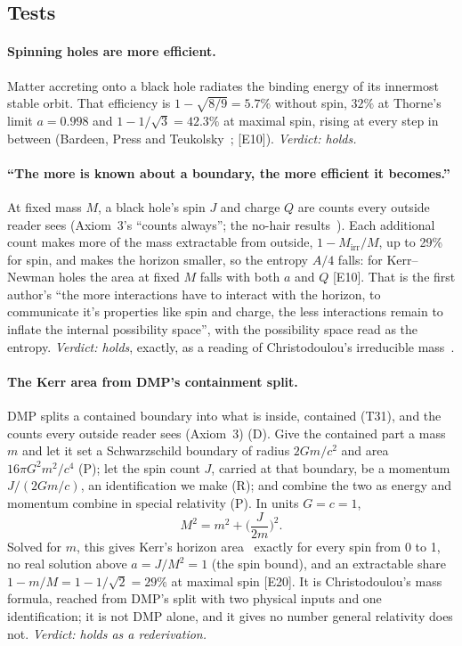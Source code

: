 \documentclass[11pt,a4paper]{article}
\theoremstyle{definition}
\theoremstyle{remark}
\newcommand{\chk}[1]{\textsf{[#1]}}
\newcommand{\tagD}{\textsf{(D)}}
\newcommand{\tagR}{\textsf{(R)}}
\newcommand{\tagP}{\textsf{(P)}}
\begin{document}
\subsection{Tests}

\paragraph{Spinning holes are more efficient.} Matter accreting onto a black hole radiates the binding energy of its innermost stable
orbit. That efficiency is $1-\sqrt{8/9}=5.7\%$ without spin, $32\%$ at Thorne's limit $a=0.998$ and $1-1/\sqrt3=42.3\%$ at maximal spin,
rising at every step in between (Bardeen, Press and Teukolsky~\cite{bpt}; \chk{E10}). \emph{Verdict: holds.}

\paragraph{``The more is known about a boundary, the more efficient it becomes.''} At fixed mass $M$, a black hole's spin $J$ and charge
$Q$ are counts every outside reader sees (Axiom~3's ``counts always''; the no-hair results~\cite{israel}). Each additional count makes
more of the mass extractable from outside, $1-M_{\text{irr}}/M$, up to 29\% for spin, and makes the horizon smaller, so the
entropy $A/4$ falls: for Kerr--Newman holes the area at fixed $M$ falls with both $a$ and $Q$ \chk{E10}. That is the first author's
``the more interactions have to interact with the horizon, to communicate it's properties like spin and charge, the less interactions
remain to inflate the internal possibility space'', with the possibility space read as the entropy. \emph{Verdict: holds}, exactly, as a
reading of Christodoulou's irreducible mass~\cite{christodoulou,cr}.

\paragraph{The Kerr area from DMP's containment split.} DMP splits a contained boundary into what is inside, contained (T31), and the counts
every outside reader sees (Axiom~3) \tagD. Give the contained part a mass $m$ and let it set a Schwarzschild boundary of radius $2Gm/c^2$
and area $16\pi G^2m^2/c^4$ \tagP; let the spin count $J$, carried at that boundary, be a momentum $J/(2Gm/c)$, an identification we
make \tagR; and combine the two as energy and momentum combine in special relativity \tagP. In units $G=c=1$,
\[
M^2=m^2+\Big(\frac{J}{2m}\Big)^2 .
\]
Solved for $m$, this gives Kerr's horizon area~\cite{kerr} exactly for every spin from 0 to 1, no real solution above $a=J/M^2=1$ (the spin
bound), and an extractable share $1-m/M=1-1/\sqrt2=29\%$ at maximal spin \chk{E20}. It is Christodoulou's mass formula, reached from DMP's
split with two physical inputs and one identification; it is not DMP alone, and it gives no number general relativity does not.
\emph{Verdict: holds as a rederivation.}
\end{document}
